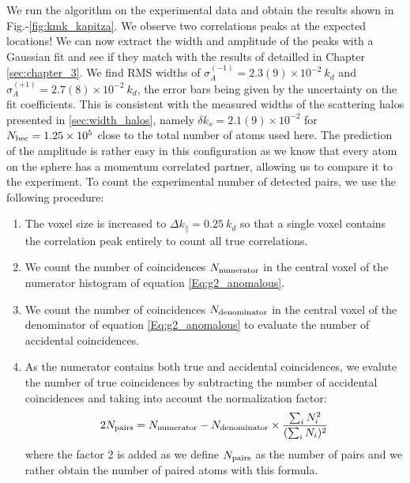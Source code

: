 We run the algorithm on the experimental data and obtain the results shown in Fig.-\ref{fig:kmk_kapitza}. We observe two correlations peaks at the expected locations! We can now extract the width and amplitude of the peaks with a Gaussian fit and see if they match with the results of \cite{tenart2020two} detailled in Chapter \ref{sec:chapter_3}. We find RMS widths of $\sigma_A^{(-1)}=2.3(9) \times 10^{-2} \ k_d$ and $\sigma_A^{(+1)}=2.7(8) \times 10^{-2} \ k_d$, the error bars being given by the uncertainty on the fit coefficients. This is consistent with the measured widths of the scattering halos presented in \ref{sec:width_halos}, namely $\delta k_s = 2.1(9) \times 10^{-2}$ for $N_{\rm{bec}}=1.25 \times 10^5$ close to the total number of atoms used here. 
The prediction of the amplitude is rather easy in this configuration as we know that every atom on the sphere has a momentum correlated partner, allowing us to compare it to the experiment. To count the experimental number of detected pairs, we use the following procedure:


\begin{enumerate}
    \item The voxel size is increased to $\Delta k_{\parallel} = 0.25 \ k_d$ so that a single voxel contains the correlation peak entirely to count all true correlations.
    
    \item We count the number of coincidences $N_{\rm{numerator}}$ in the central voxel of the numerator histogram of equation \ref{Eq:g2_anomalous}. 
 
   
    \item  We count the number of coincidences $N_{\rm{denominator}}$ in the central voxel of the denominator of equation \ref{Eq:g2_anomalous} to evaluate the number of accidental coincidences. 
    
    
    \item As the numerator contains both true and accidental coincidences, we evalute the number of true coincidences by subtracting the number of accidental coincidences and taking into account the normalization factor:
    \begin{equation}
          2N_{\rm{pairs}}=N_{\rm{numerator}} - N_{\rm{denominator}} \times \frac{\sum_i N_i^2}{(\sum_i N_i)^2}
    \end{equation}
    where the factor 2 is added as we define $N_{\rm{pairs}}$ as the number of pairs and we rather obtain the number of paired atoms with this formula.
  
\end{enumerate}

